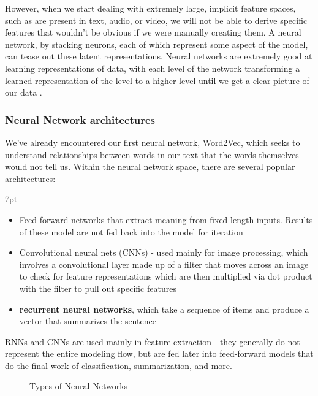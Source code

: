 \documentclass[11pt, table]{diazessay} %
\newenvironment{formal}{%
  \def\FrameCommand{%
	\hspace{1pt}%
	{\color{w_lightblue}\vrule width 2pt}%
	{\color{formalshade}\vrule width 4pt}%
	\colorbox{formalshade}%
  }%
  \MakeFramed{\advance\hsize-\width\FrameRestore}%
  \noindent\hspace{-4.55pt}%
  \begin{adjustwidth}{}{7pt}%
  \vspace{2pt}\vspace{2pt}%
}
{%
  \vspace{2pt}\end{adjustwidth}\endMakeFramed%
}
\begin{document}
\begin{sloppypar}
However, when we start dealing with extremely large, implicit feature spaces, such as are present in text, audio, or video, we will not be able to derive specific features that wouldn't be obvious if we were manually creating them. A neural network, by stacking neurons, each of which represent some aspect of the model, can tease out these latent representations. Neural networks are extremely good at learning representations of data, with each level of the network transforming a learned representation of the level to a higher level until we get a clear picture of our data \citep{lecun2015deep}.

\subsubsection{Neural Network architectures}

We've already encountered our first neural network, Word2Vec, which seeks to understand relationships between words in our text that the words themselves would not tell us. Within the neural network space, there are several popular architectures:

\begin{formal}
\begin{itemize}
  \item Feed-forward networks that extract meaning from fixed-length inputs. Results of these model are not fed back into the model for iteration
  \item Convolutional neural nets (CNNs) - used mainly for image processing, which involves a convolutional layer made up of a filter that moves across an image to check for feature representations which are then multiplied via dot product with the filter to pull out specific features
  \item \textbf{recurrent neural networks}, which take a sequence of items and produce a vector that summarizes the sentence
\end{itemize}
\end{formal}

RNNs and CNNs are used mainly in feature extraction - they generally do not represent the entire modeling flow, but are fed later into feed-forward models that do the final work of classification, summarization, and more.

\begin{figure}[H]
\centering
{}
\caption{Types of Neural Networks}
\end{figure}



\end{sloppypar}
\end{document}
